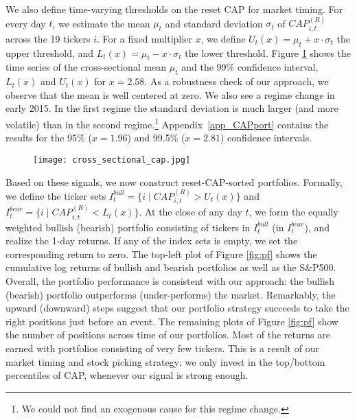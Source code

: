 We also define time-varying thresholds on the reset CAP for market timing. For every day $t$, we estimate the mean $\mu_t$ and standard deviation $\sigma_t$ of $CAP_{i,t}^{(R)}$ across the 19 tickers $i$. For a fixed multiplier $x$, we define $U_t(x) = \mu_t + x \cdot \sigma_t$ the upper threshold, and $L_t(x) = \mu_t - x \cdot \sigma_t$ the lower threshold. Figure \ref{fig:cross-sec stats} shows the time series of the cross-sectional mean $\mu_t$ and the 99\% confidence interval, $L_t(x)$ and $U_t(x)$ for $x = 2.58$. As a robustness check of our approach, we observe that the mean is well centered at zero. We also see a regime change in early 2015. In the first regime the standard deviation is much larger (and more volatile) than in the second regime.\footnote{We could not find an exogenous cause for this regime change.} Appendix~\ref{app_CAPport} contains the results for the 95\% ($x = 1.96$) and 99.5\% ($x = 2.81$) confidence intervals. 

\begin{figure}[h]
    \centering
    \texttt{[image: cross\_sectional\_cap.jpg]}
    \label{fig:cross-sec stats}
\end{figure}

Based on these signals, we now construct reset-CAP-sorted portfolios. Formally, we define the ticker sets $I^{bull}_t=\{ i\mid CAP_{i,t}^{(R)} > U_t(x)\}$ and $I^{bear}_t=\{ i\mid CAP_{i,t}^{(R)} < L_t(x)\}$. At the close of any day $t$, we form the equally weighted bullish (bearish) portfolio consisting of tickers in $I^{bull}_t$ (in $I^{bear}_t$), and realize the 1-day returns. If any of the index sets is empty, we set the corresponding return to zero. The top-left plot of Figure \ref{fig:pf} shows the cumulative log returns of bullish and bearish portfolios as well as the S\&P500. Overall, the portfolio performance is consistent with our approach: the bullish (bearish) portfolio outperforms (under-performs) the market. Remarkably, the upward (downward) steps suggest that our portfolio strategy succeeds to take the right positions just before an event. The remaining plots of Figure \ref{fig:pf} show the number of positions across time of our portfolios. Most of the returns are earned with portfolios consisting of very few tickers. This is a result of our market timing and stock picking strategy: we only invest in the top/bottom percentiles of CAP, whenever our signal is strong enough.


